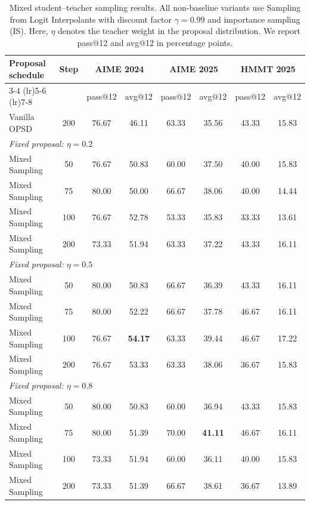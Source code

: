 \begin{table}[htb]
\centering
\scriptsize
\caption{
Mixed student--teacher sampling results. All non-baseline variants use
Sampling from Logit Interpolants with discount factor $\gamma=0.99$ and
importance sampling (IS). Here, $\eta$ denotes the teacher weight in the
proposal distribution. We report pass@12 and avg@12 in percentage points.
}
\label{tab:mixed_sampling_results}
\setlength{\tabcolsep}{4pt}
\renewcommand{\arraystretch}{1.06}

\begin{tabular}{lccccccc}
\toprule
Proposal schedule
& Step
& \multicolumn{2}{c}{AIME 2024}
& \multicolumn{2}{c}{AIME 2025}
& \multicolumn{2}{c}{HMMT 2025} \\
\cmidrule(lr){3-4}
\cmidrule(lr){5-6}
\cmidrule(lr){7-8}
&
& pass@12
& avg@12
& pass@12
& avg@12
& pass@12
& avg@12 \\
\midrule

Vanilla OPSD
& 200
& 76.67
& 46.11
& 63.33
& 35.56
& 43.33
& 15.83 \\

\midrule
\multicolumn{8}{l}{\textit{Fixed proposal: $\eta=0.2$}} \\
\quad Mixed Sampling
& 50
& 76.67
& 50.83
& 60.00
& 37.50
& 40.00
& 15.83 \\
\quad Mixed Sampling
& 75
& 80.00
& 50.00
& 66.67
& 38.06
& 40.00
& 14.44 \\
\quad Mixed Sampling
& 100
& 76.67
& 52.78
& 53.33
& 35.83
& 33.33
& 13.61 \\
\quad Mixed Sampling
& 200
& 73.33
& 51.94
& 63.33
& 37.22
& 43.33
& 16.11 \\

\midrule
\multicolumn{8}{l}{\textit{Fixed proposal: $\eta=0.5$}} \\
\quad Mixed Sampling
& 50
& 80.00
& 50.83
& 66.67
& 36.39
& 43.33
& 16.11 \\
\quad Mixed Sampling
& 75
& 80.00
& 52.22
& 66.67
& 37.78
& 46.67
& 16.11 \\
\quad Mixed Sampling
& 100
& 76.67
& \textbf{54.17}
& 63.33
& 39.44
& 46.67
& 17.22 \\
\quad Mixed Sampling
& 200
& 76.67
& 53.33
& 63.33
& 38.06
& 36.67
& 15.83 \\

\midrule
\multicolumn{8}{l}{\textit{Fixed proposal: $\eta=0.8$}} \\
\quad Mixed Sampling
& 50
& 80.00
& 50.83
& 60.00
& 36.94
& 43.33
& 15.83 \\
\quad Mixed Sampling
& 75
& 80.00
& 51.39
& 70.00
& \textbf{41.11}
& 46.67
& 16.11 \\
\quad Mixed Sampling
& 100
& 73.33
& 51.94
& 60.00
& 36.11
& 40.00
& 15.83 \\
\quad Mixed Sampling
& 200
& 73.33
& 51.39
& 66.67
& 38.61
& 36.67
& 13.89 \\


\end{tabular}
\end{table}
